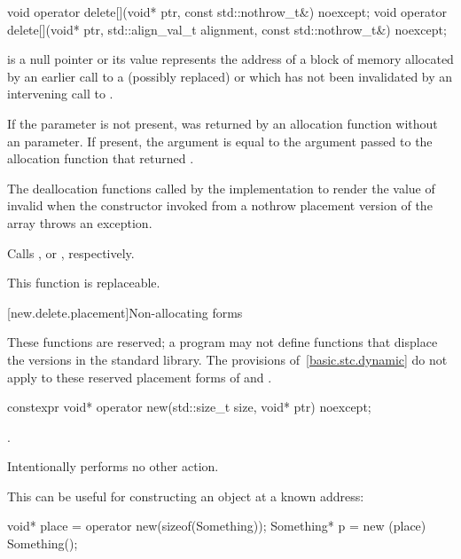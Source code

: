 %
\begin{itemdecl}
void operator delete[](void* ptr, const std::nothrow_t&) noexcept;
void operator delete[](void* ptr, std::align_val_t alignment, const std::nothrow_t&) noexcept;
\end{itemdecl}

\begin{itemdescr}
\pnum
\expects
{} is a null pointer or
its value represents the address of
a block of memory allocated by
an earlier call to a (possibly replaced)
or
which has not been invalidated by an intervening call to
.

\pnum
If the  parameter is not present,
 was returned by an allocation function
without an  parameter.
If present, the  argument
is equal to the  argument
passed to the allocation function that returned .

\pnum
\effects
The
deallocation functions
called by the implementation
to render the value of  invalid
when the constructor invoked from a nothrow
placement version of the array  throws an exception.

\pnum
{}
Calls ,
or ,
respectively.

\pnum
\remarks
This function is replaceable.
\end{itemdescr}

[new.delete.placement]{Non-allocating forms}

\pnum
These functions are reserved; a \Cpp{} program may not define functions that displace
the versions in the \Cpp{} standard library.
The provisions of~\ref{basic.stc.dynamic} do not apply to these reserved
placement forms of  and .

%
\begin{itemdecl}
constexpr void* operator new(std::size_t size, void* ptr) noexcept;
\end{itemdecl}

\begin{itemdescr}
\pnum
\returns
{}.

\pnum
\remarks
Intentionally performs no other action.

\pnum
\begin{example}
This can be useful for constructing an object at a known address:

\begin{codeblock}
void* place = operator new(sizeof(Something));
Something* p = new (place) Something();
\end{codeblock}
\end{example}
\end{itemdescr}

